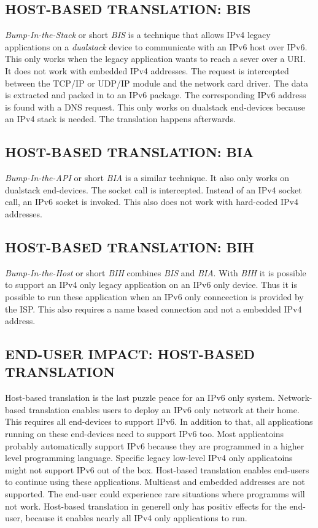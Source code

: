 \documentclass[format=sigconf, natbib=true, nonacm=true]{acmart}
\begin{document}
    \subsection{HOST-BASED TRANSLATION: BIS}
    \textit{Bump-In-the-Stack} or short \textit{BIS} is a technique that allows IPv4 legacy applications on a \textit{dualstack} device to communicate with an IPv6 host over IPv6. This only works when the legacy application wants to reach a sever over a URI. It does not work with embedded IPv4 addresses. The request is intercepted between the TCP/IP or UDP/IP module and the network card driver. The data is extracted and packed in to an IPv6 package. The corresponding IPv6 address is found with a DNS request. This only works on dualstack end-devices because an IPv4 stack is needed. The translation happens afterwards\cite{8716482}.
    \subsection{HOST-BASED TRANSLATION: BIA}
    \textit{Bump-In-the-API} or short \textit{BIA} is a similar technique. It also only works on dualstack end-devices. The socket call is intercepted. Instead of an IPv4 socket call, an IPv6 socket is invoked. This also does not work with hard-coded IPv4 addresses\cite{8716482}.
    \subsection{HOST-BASED TRANSLATION: BIH}
    \textit{Bump-In-the-Host} or short \textit{BIH} combines \textit{BIS} and \textit{BIA}. With \textit{BIH} it is possible to support an IPv4 only legacy application on an IPv6 only device. Thus it is possible to run these application when an IPv6 only conncection is provided by the ISP. This also requires a name based connection and not a embedded IPv4 address\cite{8716482}. 
    \subsection*{END-USER IMPACT: HOST-BASED TRANSLATION}
    Host-based translation is the last puzzle peace for an IPv6 only system. Network-based translation enables users to deploy an IPv6 only network at their home. This requires all end-devices to support IPv6. In addition to that, all applications running on these end-devices need to support IPv6 too. Most applicatoins probably automatically support IPv6 because they are programmed in a higher level programming language. Specific legacy low-level IPv4 only applicatoins might not support IPv6 out of the box. Host-based translation enables end-users to continue using these applications. Multicast and embedded addresses are not supported. The end-user could experience rare situations where programms will not work. Host-based translation in generell only has positiv effects for the end-user, because it enables nearly all IPv4 only applications to run.
\end{document}
